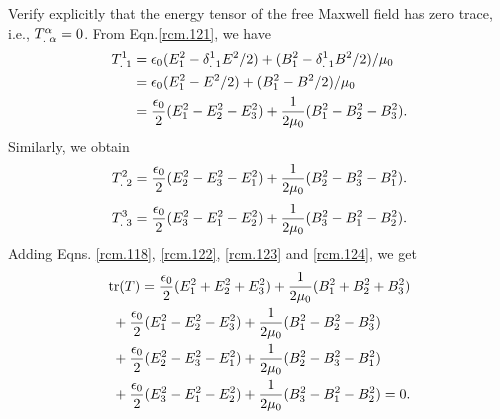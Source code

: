 \exm Verify explicitly that the energy tensor of the free 
Maxwell field has zero trace, i.e., 
${{T}^{{\alpha}}_{.\;{\alpha}}}=0$. \soln From Eqn.\eqref{rcm.121}, 
we have
\begin{align}\label{rcm.122}
{\ensuremath{{T}^{1}_{.\;1}}}&
=\epsilon_0(E_1^2 -{{\delta}^{1}_{.\;1}}E^2/2)+(B_1^2
-{{\delta}^{1}_{.\;1}} B^2/2)/\mu_0 \notag \\
&=\epsilon_0(E_1^2 -E^2/2)+(B_1^2-B^2/2)/\mu_0 \notag\\
&=\frac{\epsilon_0}{2}
(E_1^2-E_2^2-E_3^2)+\frac{1}{2\mu_0}
(B_1^2-B_2^2-B_3^2).
\end{align}
Similarly, we obtain
\begin{align}\label{rcm.123}
{\ensuremath{{T}^{2}_{.\;2}}}=\frac{\epsilon_0}{2}
(E_2^2-E_3^2-E_1^2)+\frac{1}{2\mu_0}
(B_2^2-B_3^2-B_1^2).
\end{align}
\begin{align}\label{rcm.124}{\ensuremath{{T}^{3}_{.\;3}}}
=\frac{\epsilon_0}{2}
(E_3^2-E_1^2-E_2^2)+\frac{1}{2\mu_0}
(B_3^2-B_1^2-B_2^2).
\end{align}
Adding Eqns. \eqref{rcm.118}, \eqref{rcm.122}, 
\eqref{rcm.123}
and \eqref{rcm.124}, we get
\begin{align}\label{rcm.125}
&\text{tr}(T) =\frac{\epsilon_0}{2} (E_1^2+E_2^2+E_3^2)
+\frac{1}{2\mu_0} (B_1^2+B_2^2+B_3^2)\notag\\
&\;+\frac{\epsilon_0}{2}
(E_1^2-E_2^2-E_3^2)+\frac{1}{2\mu_0}
(B_1^2-B_2^2-B_3^2)\notag\\
&\;+\frac{\epsilon_0}{2}
(E_2^2-E_3^2-E_1^2)+\frac{1}{2\mu_0}
(B_2^2-B_3^2-B_1^2)\notag\\
&\;+\frac{\epsilon_0}{2}(E_3^2-E_1^2-E_2^2)
+\frac{1}{2\mu_0} (B_3^2-B_1^2-B_2^2)=0.
\end{align} \ebxns

